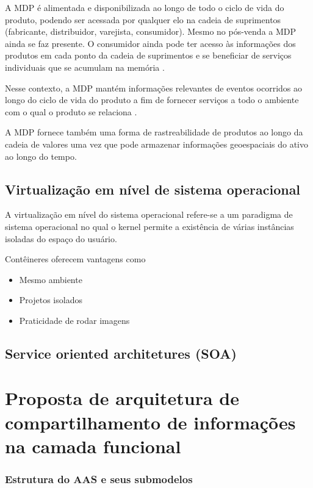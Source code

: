 \documentclass[
	12pt,				%
	oneside,			%
	a4paper,			%
	english,			%
	brazil				%
]{abntex2}
\begin{document}
	A MDP é alimentada e disponibilizada ao longo de todo o ciclo de vida do produto, podendo ser acessada por qualquer elo na cadeia de suprimentos (fabricante, distribuidor, varejista, consumidor). Mesmo no pós-venda a MDP ainda se faz presente. O consumidor ainda pode ter acesso às informações dos produtos em cada ponto da cadeia de suprimentos e se beneficiar de serviços individuais que se acumulam na memória \cite{brandherm2011productmemory}.

	Nesse contexto, a MDP mantém informações relevantes de eventos ocorridos ao longo do ciclo de vida do produto a fim de fornecer serviços a todo o ambiente com o qual o produto se relaciona \cite{brandherm2011productmemory}.
	
	A MDP fornece também uma forma de rastreabilidade de produtos ao longo da cadeia de valores uma vez que pode armazenar informações geoespaciais do ativo ao longo do tempo.

	\section{Virtualização em nível de sistema operacional}
	
	A virtualização em nível do sistema operacional refere-se a um paradigma de sistema operacional no qual o kernel permite a existência de várias instâncias isoladas do espaço do usuário.

	Contêineres oferecem vantagens como
	
	\begin{itemize}
		\item Mesmo ambiente
		\item Projetos isolados
		\item Praticidade de rodar imagens
	\end{itemize}

	\section{Service oriented architetures (SOA)}
	
	\lipsum[1-1]

\chapter{Proposta de arquitetura de compartilhamento de informações na camada funcional}

	\subsection{Estrutura do AAS e seus submodelos}
\end{document}
